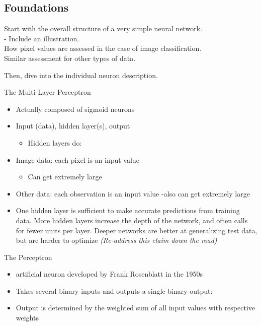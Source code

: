 

\hypertarget{foundations}{%
\subsection{Foundations}\label{foundations}}

Start with the overall structure of a very simple neural network.\\
- Include an illustration.\\
How pixel values are assessed in the case of image classification.\\
Similar assessment for other types of data.

Then, dive into the individual neuron description.

The Multi-Layer Perceptron

\begin{itemize}
\tightlist
\item
  Actually composed of sigmoid neurons
\item
  Input (data), hidden layer(s), output

  \begin{itemize}
  \tightlist
  \item
    Hidden layers do:
  \end{itemize}
\item
  Image data: each pixel is an input value

  \begin{itemize}
  \tightlist
  \item
    Can get extremely large
  \end{itemize}
\item
  Other data: each observation is an input value -also can get extremely
  large
\item
  One hidden layer is sufficient to make accurate predictions from
  training data. More hidden layers increase the depth of the network,
  and often calls for fewer units per layer. Deeper networks are better
  at generalizing test data, but are harder to optimize
  \cite{Goodfellow-et-al-2016} \emph{(Re-address this claim down the
  road)}
\end{itemize}

The Perceptron

\begin{itemize}
\tightlist
\item
  artificial neuron developed by Frank Rosenblatt in the 1950s
  \cite{nielsen}
\item
  Takes several binary inputs and outputs a single binary output:
\item
  Output is determined by the weighted sum of all input values with
  respective weights
\end{itemize}

